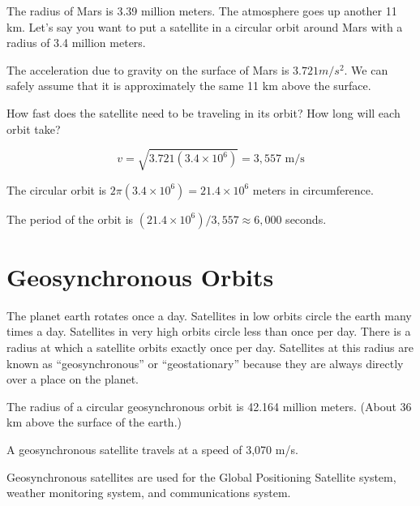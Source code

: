 \begin{Exercise}[title={Mars Orbit}, label=mars_orbit]
  
  The radius of Mars is 3.39 million meters. The atmosphere goes up
  another 11 km.  Let's say you want to put a satellite in a circular
  orbit around Mars with a radius of 3.4 million meters.

  The acceleration due to gravity on the surface of Mars is $3.721
  m/s^2$. We can safely assume that it is approximately the same 11 km
  above the surface.

  How fast does the satellite need to be traveling in its orbit?  How
  long will each orbit take?

\end{Exercise}
\begin{Answer}[ref=circular]
  $$v = \sqrt{3.721(3.4 \times 10^6)} = 3,557\text{ m/s}$$

  The circular orbit is $2\pi(3.4 \times 10^6) = 21.4 \times 10^6$ meters in circumference.

  The period of the orbit is $(21.4 \times 10^6)/3,557 \approx 6,000$ seconds.
\end{Answer}

\section{Geosynchronous Orbits}

The planet earth rotates once a day.  Satellites in low orbits circle
the earth many times a day. Satellites in very high orbits circle
less than once per day. There is a radius at which a satellite orbits
exactly once per day.  Satellites at this radius are known as
``geosynchronous'' or ``geostationary'' because they are always
directly over a place on the planet.

The radius of a circular geosynchronous orbit is 42.164 million
meters. (About 36 km above the surface of the earth.)

A geosynchronous satellite travels at a speed of 3,070 m/s.

Geosynchronous satellites are used for the Global Positioning
Satellite system, weather monitoring system, and communications
system.




